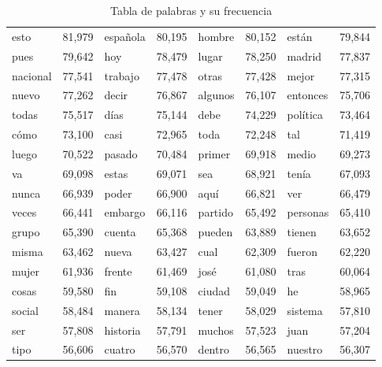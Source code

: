 \begin{table}
\begin{tabular}{|l|l|l|l|l|l|l|l|}
   
   	esto	 &  81,979	& 
   	espa\~nola &	   80,195	&
   	hombre 	 &  80,152 &
   	est\'an	 &  79,844	\\
  	pues 	 &  79,642	&
   	hoy 	&   78,479	 &
   	lugar	&   78,250	   &
   	madrid 	&   77,837	   \\
  	nacional	&   77,541	&
   	trabajo	&   77,478	  &
   	otras	&   77,428	  &
  	mejor	&   77,315	  \\
  	nuevo 	&   77,262	  &
  	decir	&   76,867	 &
   	algunos &	   76,107	  &
   	entonces &	   75,706	  \\
   	todas	 &  75,517	  &  	   
   	d\'ias	&   75,144	   &
   	debe 	&   74,229	  & 
   	pol\'itica	&   73,464	\\
   	c\'omo 	&   73,100	  &
   	casi	&   72,965	   &
   	toda	&   72,248	&
   	tal	  & 71,419\\
   	luego	&   70,522	&
   	pasado 	 &  70,484 &
   	primer	 &  69,918	 &
   	medio 	&   69,273	  \\
   	va	 &  69,098	  &
   	estas &	   69,071	 &
   	sea  &	   68,921	  &
   	ten\'ia	&   67,093	\\
   	nunca 	&   66,939 &
   	poder &	   66,900 &
   	aqu\'i &	   66,821	  &
   	ver	  & 66,479	   \\
   	
   	 veces 	 &  66,441	 &
   embargo 	 &  66,116	 &
   partido	 &  65,492 &
   personas &	   65,410	 \\
   grupo	&   65,390	&
   cuenta 	&   65,368 &
   pueden 	&   63,889	&
   tienen	&   63,652	  \\
   misma  	&   63,462	   &
   nueva 	&   63,427	&
   cual	  & 62,309	   &
   fueron	&   62,220	   \\
   mujer	&   61,936	 &
   frente	&   61,469	  &
   jos\'e	&   61,080	  &
   tras	  & 60,064	 \\
   cosas  &	   59,580	 &
   fin	  & 59,108	   &
   ciudad &	   59,049	   &
   he	 &  58,965	  \\
   social	 &  58,484	  &
   manera 	 &  58,134	 &
   tener	 &  58,029	  &
   sistema 	 &  57,810	   \\
   ser	  & 57,808	&
   historia	&   57,791	   &
   muchos  &	   57,523	  &
   juan	  & 57,204	   \\
   tipo	 &  56,606	 &
   cuatro	&   56,570	   &
   dentro	&   56,565	 &
   nuestro	&   56,307	   \\ 
    	    
    	\hline
   


\end{tabular}
\caption{Tabla de palabras y su frecuencia} 
\end{table}


